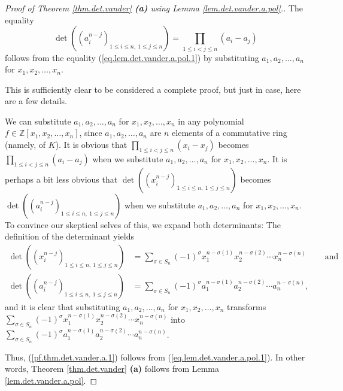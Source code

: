 \begin{proof}
[Proof of Theorem \ref{thm.det.vander} \textbf{(a)} using Lemma
\ref{lem.det.vander.a.pol}.]The equality%
\begin{equation}
\det\left(  \left(  a_{i}^{n-j}\right)  _{1\leq i\leq n,\ 1\leq j\leq
n}\right)  =\prod_{1\leq i<j\leq n}\left(  a_{i}-a_{j}\right)
\label{pf.thm.det.vander.a.1}%
\end{equation}
follows from the equality (\ref{eq.lem.det.vander.a.pol.1}) by substituting
$a_{1},a_{2},\ldots,a_{n}$ for $x_{1},x_{2},\ldots,x_{n}$. \medskip

\begin{fineprint}
This is sufficiently clear to be considered a complete proof, but just in
case, here are a few details.

We can substitute $a_{1},a_{2},\ldots,a_{n}$ for $x_{1},x_{2},\ldots,x_{n}$ in
any polynomial $f\in\mathbb{Z}\left[  x_{1},x_{2},\ldots,x_{n}\right]  $,
since $a_{1},a_{2},\ldots,a_{n}$ are $n$ elements of a commutative ring
(namely, of $K$). It is obvious that $\prod_{1\leq i<j\leq n}\left(
x_{i}-x_{j}\right)  $ becomes $\prod_{1\leq i<j\leq n}\left(  a_{i}%
-a_{j}\right)  $ when we substitute $a_{1},a_{2},\ldots,a_{n}$ for
$x_{1},x_{2},\ldots,x_{n}$. It is perhaps a bit less obvious that $\det\left(
\left(  x_{i}^{n-j}\right)  _{1\leq i\leq n,\ 1\leq j\leq n}\right)  $ becomes
$\det\left(  \left(  a_{i}^{n-j}\right)  _{1\leq i\leq n,\ 1\leq j\leq
n}\right)  $ when we substitute $a_{1},a_{2},\ldots,a_{n}$ for $x_{1}%
,x_{2},\ldots,x_{n}$. To convince our skeptical selves of this, we expand both
determinants: The definition of the determinant yields%
\begin{align*}
\det\left(  \left(  x_{i}^{n-j}\right)  _{1\leq i\leq n,\ 1\leq j\leq
n}\right)   &  =\sum_{\sigma\in S_{n}}\left(  -1\right)  ^{\sigma}%
x_{1}^{n-\sigma\left(  1\right)  }x_{2}^{n-\sigma\left(  2\right)  }\cdots
x_{n}^{n-\sigma\left(  n\right)  }\ \ \ \ \ \ \ \ \ \ \text{and}\\
\det\left(  \left(  a_{i}^{n-j}\right)  _{1\leq i\leq n,\ 1\leq j\leq
n}\right)   &  =\sum_{\sigma\in S_{n}}\left(  -1\right)  ^{\sigma}%
a_{1}^{n-\sigma\left(  1\right)  }a_{2}^{n-\sigma\left(  2\right)  }\cdots
a_{n}^{n-\sigma\left(  n\right)  },
\end{align*}
and it is clear that substituting $a_{1},a_{2},\ldots,a_{n}$ for $x_{1}%
,x_{2},\ldots,x_{n}$ transforms \newline$\sum_{\sigma\in S_{n}}\left(
-1\right)  ^{\sigma}x_{1}^{n-\sigma\left(  1\right)  }x_{2}^{n-\sigma\left(
2\right)  }\cdots x_{n}^{n-\sigma\left(  n\right)  }$ into $\sum_{\sigma\in
S_{n}}\left(  -1\right)  ^{\sigma}a_{1}^{n-\sigma\left(  1\right)  }%
a_{2}^{n-\sigma\left(  2\right)  }\cdots a_{n}^{n-\sigma\left(  n\right)  }$.
\end{fineprint}

Thus, (\ref{pf.thm.det.vander.a.1}) follows from
(\ref{eq.lem.det.vander.a.pol.1}). In other words, Theorem
\ref{thm.det.vander} \textbf{(a)} follows from Lemma
\ref{lem.det.vander.a.pol}.
\end{proof}

